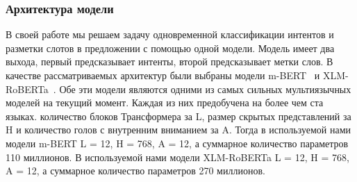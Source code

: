 \subsubsection{Архитектура модели}
В своей работе мы решаем задачу одновременной классификации интентов и разметки слотов в предложении с помощью одной модели.
Модель имеет два выхода, первый предсказывает интенты, второй предсказывает метки слов.
В качестве рассматриваемых архитектур были выбраны модели m-BERT~\cite{devlin-etal-2019-bert} и XLM-RoBERTa~\cite{Conneau2020UnsupervisedCR}.
Обе эти модели являются одними из самых сильных мультиязычных моделей на текущий момент.
Каждая из них предобучена на более чем ста языках.
 количество блоков Трансформера за L, размер скрытых представлений за H и количество голов с внутренним вниманием за A\@.
Тогда в используемой нами модели m-BERT L = 12, H = 768, A = 12, а суммарное количество параметров 110 миллионов.
В используемой нами модели XLM-RoBERTa L = 12, H = 768, A = 12, а суммарное количество параметров 270 миллионов.

